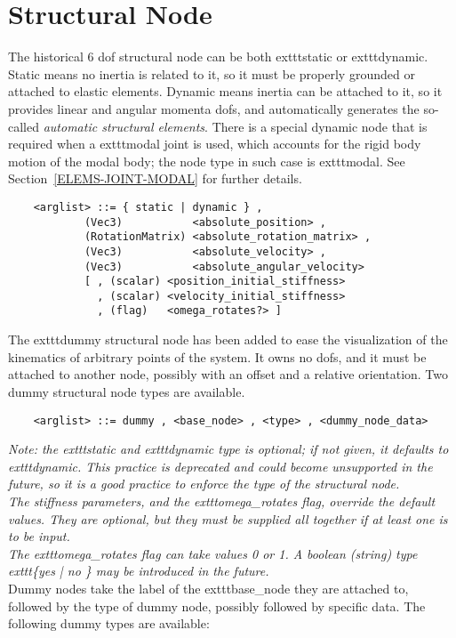 \section{Structural Node}\label{sec:NODE-STRUCT}
The historical 6 dof structural node can be both 	exttt{static}
or 	exttt{dynamic}.
Static means no inertia is related to it, so it must be properly grounded 
or attached to elastic elements.
Dynamic means inertia can be attached to it, so it provides linear and
angular momenta dofs, and automatically generates the so-called 
{\em automatic structural elements}.
There is a special dynamic node that is required when a 	exttt{modal} joint is
used, which accounts for the rigid body motion of the modal body; the node
type in such case is 	exttt{modal}.
See Section~\ref{ELEMS-JOINT-MODAL} for further details.
\begin{verbatim}
    <arglist> ::= { static | dynamic } ,
            (Vec3)           <absolute_position> ,
            (RotationMatrix) <absolute_rotation_matrix> ,
            (Vec3)           <absolute_velocity> ,
            (Vec3)           <absolute_angular_velocity>
            [ , (scalar) <position_initial_stiffness>
              , (scalar) <velocity_initial_stiffness>
              , (flag)   <omega_rotates?> ]
\end{verbatim}
The 	exttt{dummy} structural node has been added to ease the visualization of
the kinematics of arbitrary points of the system. 
It owns no dofs, and it must be attached to another node, possibly with an
offset and a relative orientation.
Two dummy structural node types are available.
\begin{verbatim}
    <arglist> ::= dummy , <base_node> , <type> , <dummy_node_data>
\end{verbatim}
{\em 
    Note: the 	exttt{static} and 	exttt{dynamic} type is optional; if not given,
    it defaults to 	exttt{dynamic}. 
    This practice is deprecated and could become unsupported in the future, 
    so it is a good practice to enforce the type of the structural node. \\
    The stiffness parameters, and the 	exttt{omega\_rotates} flag, 
    override the default values. 
    They are optional, but they must be supplied all together if at least
    one is to be input. \\
    The 	exttt{omega\_rotates} flag can take values 0 or 1. 
    A boolean (string) type 	exttt{\{yes | no \}} may be introduced in the
    future. 
} \\
Dummy nodes take the label of the 	exttt{base\_node} they are attached to, 
followed by the type of dummy node, possibly followed by specific data.
The following dummy types are available:

